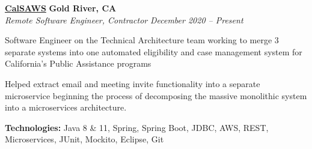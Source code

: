 %
    \headerrow
        {\textbf{\href{https://www.calsaws.org/}{CalSAWS}}}
        {\textbf{Gold River, CA}}
    \\
    \headerrow
        {\emph{Remote Software Engineer, Contractor}}
        {\emph{December 2020 -- Present}}
    \begin{itemize*}
        \item Software Engineer on the Technical Architecture team working to merge 3 separate systems into
            one automated eligibility and case management system for California's Public Assistance programs
        \item Helped extract email and meeting invite functionality into a separate microservice beginning the process of decomposing
            the massive monolithic system into a microservices architecture.
    \end{itemize*}

    \hspace{1.0em}
        {\textbf{Technologies:} Java 8 \& 11, Spring, Spring Boot, JDBC, AWS, REST, Microservices, JUnit, Mockito, Eclipse, Git}

